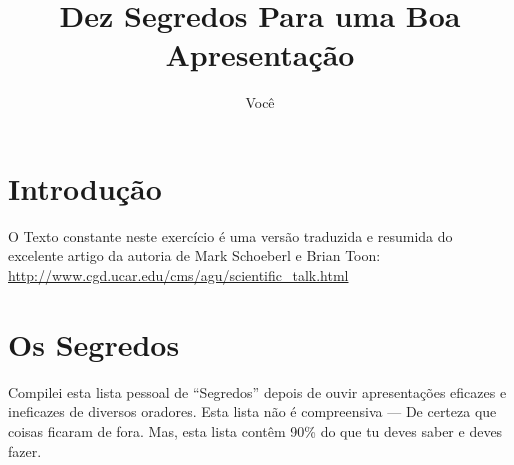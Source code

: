 \documentclass[12pt]{article}
\title{Dez Segredos Para uma Boa Apresentação}
\author{Você}
\begin{document}
\maketitle

\section{Introdução}

O Texto constante neste exercício é uma versão traduzida e resumida do excelente artigo da autoria de Mark Schoeberl e Brian Toon:
\url{http://www.cgd.ucar.edu/cms/agu/scientific_talk.html}

\section{Os Segredos}


Compilei esta lista pessoal de ``Segredos'' depois de ouvir apresentações eficazes e ineficazes de diversos oradores. Esta lista não é compreensiva --- De certeza que coisas ficaram de fora. Mas, esta lista contêm 90\% do que tu deves saber e deves fazer.
\end{document}
